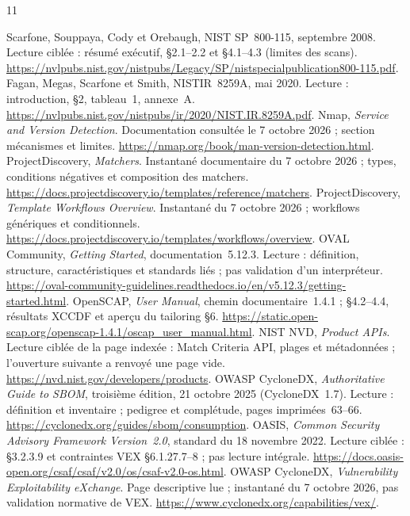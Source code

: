 \documentclass[11pt,a4paper]{article}
\begin{document}
\begingroup\small
\begin{thebibliography}{11}
 Scarfone, Souppaya, Cody et Orebaugh, NIST SP~800-115, septembre 2008. Lecture ciblée : résumé exécutif, §2.1--2.2 et §4.1--4.3 (limites des scans). \url{https://nvlpubs.nist.gov/nistpubs/Legacy/SP/nistspecialpublication800-115.pdf}.
 Fagan, Megas, Scarfone et Smith, NISTIR~8259A, mai 2020. Lecture : introduction, §2, tableau~1, annexe~A. \url{https://nvlpubs.nist.gov/nistpubs/ir/2020/NIST.IR.8259A.pdf}.
 Nmap, \emph{Service and Version Detection}. Documentation consultée le 7 octobre 2026 ; section mécanismes et limites. \url{https://nmap.org/book/man-version-detection.html}.
 ProjectDiscovery, \emph{Matchers}. Instantané documentaire du 7 octobre 2026 ; types, conditions négatives et composition des matchers. \url{https://docs.projectdiscovery.io/templates/reference/matchers}.
 ProjectDiscovery, \emph{Template Workflows Overview}. Instantané du 7 octobre 2026 ; workflows génériques et conditionnels. \url{https://docs.projectdiscovery.io/templates/workflows/overview}.
 OVAL Community, \emph{Getting Started}, documentation~5.12.3. Lecture : définition, structure, caractéristiques et standards liés ; pas validation d'un interpréteur. \url{https://oval-community-guidelines.readthedocs.io/en/v5.12.3/getting-started.html}.
 OpenSCAP, \emph{User Manual}, chemin documentaire~1.4.1 ; §4.2--4.4, résultats XCCDF et aperçu du tailoring §6. \url{https://static.open-scap.org/openscap-1.4.1/oscap_user_manual.html}.
 NIST NVD, \emph{Product APIs}. Lecture ciblée de la page indexée : Match Criteria API, plages et métadonnées ; l'ouverture suivante a renvoyé une page vide. \url{https://nvd.nist.gov/developers/products}.
 OWASP CycloneDX, \emph{Authoritative Guide to SBOM}, troisième édition, 21 octobre 2025 (CycloneDX~1.7). Lecture : définition et inventaire ; pedigree et complétude, pages imprimées~63--66. \url{https://cyclonedx.org/guides/sbom/consumption}.
 OASIS, \emph{Common Security Advisory Framework Version~2.0}, standard du 18 novembre 2022. Lecture ciblée : §3.2.3.9 et contraintes VEX §6.1.27.7--8 ; pas lecture intégrale. \url{https://docs.oasis-open.org/csaf/csaf/v2.0/os/csaf-v2.0-os.html}.
 OWASP CycloneDX, \emph{Vulnerability Exploitability eXchange}. Page descriptive lue ; instantané du 7 octobre 2026, pas validation normative de VEX. \url{https://www.cyclonedx.org/capabilities/vex/}.
\end{thebibliography}
\endgroup
\end{document}
